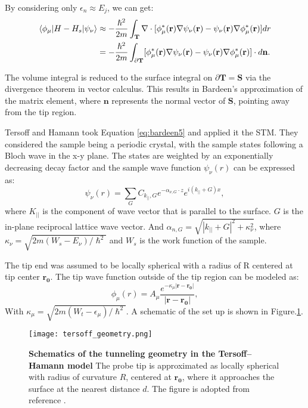 By considering only $\epsilon_n \approx E_j$, we can get:
\begin{align}
	\label{eq:bardeen4}
	\braket{\phi_{\mu}|H-H_s|\psi_{\nu}} &\approx -\frac{\hslash^2}{2m}\int_\mathbf{T}\nabla \cdot [\phi_{\mu}^*(\mathbf{r})\nabla\psi_{\nu}(\mathbf{r})-\psi_{\nu}(\mathbf{r})\nabla\phi_{\mu}^*(\mathbf{r})]dr\\ \label{eq:bardeen5}
	& = -\frac{\hslash^2}{2m}\int_{\partial\mathbf{T}}[\phi_{\mu}^*(\mathbf{r})\nabla\psi_{\nu}(\mathbf{r})-\psi_{\nu}(\mathbf{r})\nabla\phi_{\mu}^*(\mathbf{r})]\cdot d\mathbf{n}.
\end{align}

The volume integral is reduced to the surface integral on $\partial \mathbf{T} = \mathbf{S}$ via the divergence theorem in vector calculus. This results in Bardeen's approximation of the matrix element, where $\mathbf{n}$ represents the normal vector of $\mathbf{S}$, pointing away from the tip region.  

Tersoff and Hamann took Equation \ref{eq:bardeen5} and applied it the \ac{STM}. They considered the sample being a periodic crystal, with the sample states following a Bloch wave in the x-y plane. The states are weighted by an exponentially decreasing decay factor and the sample wave function $\psi_{\nu}(r)$ can be expressed as:
\begin{equation}
	\label{eq:sample_wavefunction}
	\psi_{\nu}(r) = \sum_G C_{k_{||},G} e^{-\alpha_{\nu,G}\cdot z }e^{i(k_{||}+G)x},
\end{equation}
where $K_{||}$ is the component of wave vector that is parallel to the surface. $G$ is the in-plane reciprocal lattice wave vector. And $\alpha_{n,G} = \sqrt{|k_{||}+G|^2 + \kappa_{\nu}^2}$, where $\kappa_{\nu} = \sqrt{2m(W_s - E_{\nu})/\hslash^2}$ and $W_s$ is the work function of the sample. 

The tip end was assumed to be locally spherical with a radius of R centered at tip center $\mathbf{r_0}$. The tip wave function outside of the tip region can be modeled as:
\begin{equation}
	\label{eq:tip_wavefunction}
	\phi_{\mu}(r) = A_{\mu} \frac{e^{-\kappa_{\mu} |\mathbf{r-r_0}|}}{|\mathbf{r-r_0}|},
\end{equation}
With $\kappa_{\mu} = \sqrt{2m(W_t-\epsilon_{\mu})/\hslash^2}$. A schematic of the set up is shown in Figure.\ref{fig:tersoff}. 
\begin{figure}
	\centering
	\texttt{[image: tersoff\_geometry.png]}
	\caption[\textbf{Schematics of the tunneling geometry in the Tersoff–Hamann model}]{\textbf{Schematics of the tunneling geometry in the Tersoff–Hamann model} The probe tip is approximated as locally spherical with radius of curvature $R$, centered at $\mathbf{r_0}$, where it approaches the surface at the nearest distance $d$. The figure is adopted from reference \cite{tersoffTheoryScanningTunneling1985}.}
	\label{fig:tersoff}
\end{figure}


